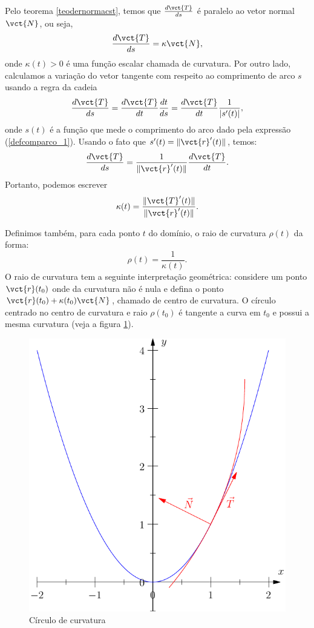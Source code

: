 Pelo teorema \ref{teodernormacst}, temos que $\frac{d \vct{T} }{ds}$ é paralelo ao vetor normal $\vct{N}$, ou seja,
\begin{equation}{\label{Frenet_1}}
\frac{d \vct{T} }{ds}=\kappa   \vct{N},
\end{equation}
onde $\kappa(t)>0$ é uma função escalar chamada de curvatura. Por outro lado, calculamos a variação do vetor tangente com respeito ao comprimento de arco $s$ usando a regra da cadeia
$$
\frac{d \vct{T} }{ds}=\frac{d \vct{T} }{dt}\frac{dt}{ds}=\frac{d \vct{T} }{dt}\frac{1}{|s'(t)|},
$$
onde $s(t)$ é a função que mede o comprimento do arco dado pela expressão (\ref{defcomparco_1}). Usando o fato que $s'(t)=\|\vct{r}'(t)\|$, temos:
$$
\frac{d \vct{T} }{ds}=\frac{1}{\|\vct{r}'(t)\|}\frac{d \vct{T} }{dt}.
$$
Portanto, podemos escrever
$$
\kappa(t)=\frac{\|\vct{T}'(t)\|}{\|\vct{r}'(t)\|}.
$$

Definimos também, para cada ponto $t$ do domínio, o raio de curvatura $\rho(t)$ da forma:
$$
\rho(t)=\frac{1}{\kappa(t)}.
$$
O raio de curvatura tem a seguinte interpretação geométrica: considere um ponto $\vct{r}(t_0)$ onde da curvatura não é nula e defina o ponto $\vct{r}(t_0)+\kappa(t_0)\vct{N}$, chamado de centro de curvatura. O círculo centrado no centro de curvatura e raio $\rho(t_0)$ é tangente a curva em $t_0$ e possui a mesma curvatura (veja a figura \ref{raio_de_curvatura}).


\begin{figure}
\begin{center}
    \includegraphics{./cap_curvas/figs/circulo_curvatura_parabola}
 \caption{Círculo de curvatura}\label{raio_de_curvatura}
  \end{center}
\end{figure}

